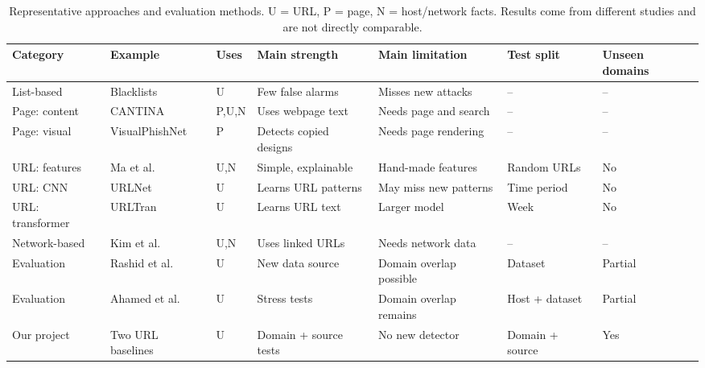 \documentclass[sigconf,nonacm]{acmart}
\begin{document}
\begin{table}[t]
\centering\caption{Representative approaches and evaluation methods. U = URL, P = page, N = host/network facts. Results come from different studies and are not directly comparable.}\label{tab:comparison}
\scriptsize\renewcommand{\arraystretch}{1.3}\setlength{\tabcolsep}{3.5pt}
\begin{tabular}{@{}lllllll@{}}\toprule
Category & Example & Uses & Main strength & Main limitation & Test split & Unseen domains\\\midrule
List-based & Blacklists \cite{sheng} & U & Few false alarms & Misses new attacks & -- & --\\
Page: content & CANTINA \cite{cantina} & P,U,N & Uses webpage text & Needs page and search & -- & --\\
Page: visual & VisualPhishNet \cite{visual} & P & Detects copied designs & Needs page rendering & -- & --\\
URL: features & Ma et al. \cite{ma} & U,N & Simple, explainable & Hand-made features & Random URLs & No\\
URL: CNN & URLNet \cite{urlnet} & U & Learns URL patterns & May miss new patterns & Time period & No\\
URL: transformer & URLTran \cite{urltran} & U & Learns URL text & Larger model & Week & No\\
Network-based & Kim et al. \cite{kim} & U,N & Uses linked URLs & Needs network data & -- & --\\
Evaluation & Rashid et al. \cite{rashid} & U & New data source & Domain overlap possible & Dataset & Partial\\
Evaluation & Ahamed et al. \cite{ahamed} & U & Stress tests & Domain overlap remains & Host + dataset & Partial\\
Our project & Two URL baselines & U & Domain + source tests & No new detector & Domain + source & Yes\\\bottomrule
\end{tabular}
\end{table}
\end{document}
